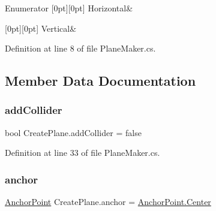 \begin{DoxyEnumFields}{Enumerator}
[0pt][0pt]{}\mbox{\label{class_create_plane_a7db5f8e98159fe90f49c5ede4e04a3d2ac1b5fa03ecdb95d4a45dd1c40b02527f}} 
Horizontal&\\
\hline

[0pt][0pt]{}\mbox{\label{class_create_plane_a7db5f8e98159fe90f49c5ede4e04a3d2a06ce2a25e5d12c166a36f654dbea6012}} 
Vertical&\\
\hline

\end{DoxyEnumFields}


Definition at line 8 of file Plane\+Maker.\+cs.



\subsection{Member Data Documentation}
\mbox{\label{class_create_plane_a2295e919f3e627a60a92e34d04c2fe53}} 
\subsubsection{\texorpdfstring{add\+Collider}{addCollider}}
{\footnotesize\ttfamily bool Create\+Plane.\+add\+Collider = false}



Definition at line 33 of file Plane\+Maker.\+cs.

\mbox{\label{class_create_plane_aade926f82883a18f1f7be97e40de3934}} 
\subsubsection{\texorpdfstring{anchor}{anchor}}
{\footnotesize\ttfamily \mbox{\hyperlink{class_create_plane_a9355b690af33c2b449c1ce539006ecfc}{Anchor\+Point}} Create\+Plane.\+anchor = \mbox{\hyperlink{class_create_plane_a9355b690af33c2b449c1ce539006ecfca4f1f6016fc9f3f2353c0cc7c67b292bd}{Anchor\+Point.\+Center}}}




